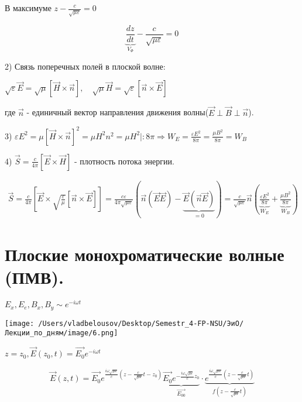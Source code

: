 \documentclass[12pt, a4paper]{report}
\begin{document}
В максимуме \( z - \frac{c}{ \sqrt{ \mu \varepsilon}} = 0   \) 

\[ \displaystyle  \underbrace{\frac{dz}{dt} }_{V_{\Phi }  }- \frac{c}{\sqrt{ \mu \varepsilon}}=0   \] 

2) Связь поперечных полей в плоской волне: 

\( \displaystyle  \sqrt{\varepsilon} \vec{E} = \sqrt{ \mu} [\vec{H}\times \vec{n}], \quad \sqrt{\mu} \vec{H} = \sqrt{ \varepsilon} [\vec{n}\times \vec{E}] \)

где \( \vec{n } \) - единичный вектор направления движения волны(\(  \vec{E} \perp \vec{B} \perp \vec{n} \)). 

3) \( \displaystyle \varepsilon E ^2 = \mu [ \displaystyle \vec{H}\times  \vec{n }] ^2 = \mu H ^2 n ^2 = \mu H ^2 | : 8 \pi \Rightarrow W_E = \frac{\varepsilon E ^2 }{8 \pi} =\frac{\mu B ^2 }{8 \pi} = W_B  \) 

4) \( \vec{S}= \frac{c}{4 \pi}   [ \vec{E}\times \vec{H }] \) - плотность потока энергии. 

\begin{gather*}
    \vec{S} = \frac{c}{4 \pi} [\vec{E } \times  \sqrt{\frac{\varepsilon}{\mu} }[\vec{n }\times  \vec{E}]]= \frac{c \varepsilon}{4 \pi \sqrt{ \mu \varepsilon}} \left( \vec{n}( \vec{E}\vec{E}) - \underbrace{\vec{E}( \vec{n }\vec{E})}_{=0}   \right)= \frac{c}{\sqrt{ \mu \varepsilon}} \vec{n} \left( \underbrace{\frac{\varepsilon E ^2 }{8 \pi}}_{W_E}  +\underbrace{\frac{\mu B ^2 }{8 \pi}  }_{W_B}  \right)   
\end{gather*}

\section{Плоские монохроматические волные (ПМВ).}

\( E_x, E_e, B_x, B_y \sim e^{-i \omega t}   \) 

\text{ }

\begin{minipage}{0.5\textwidth}
    \texttt{[image: /Users/vladbelousov/Desktop/Semestr\_4-FP-NSU/ЭиО/Лекции\_по\_дням/image/6.png]}
\end{minipage}
\begin{minipage}{0.5\textwidth}
     \( z = z_0 , \vec{E}( z_0,t )= \vec{E_0}e^{-i \omega t} \) 
\end{minipage}

\begin{gather*}
  \displaystyle   \vec{E}( z,t)= \vec{E_0} e^{\frac{i \omega \sqrt{ \mu \varepsilon}}{c} \left( z- \frac{c}{\sqrt{\mu \varepsilon}} t -z_0  \right) } \underbrace{\vec{E_0}e^{-\frac{i \omega \sqrt{ \mu \varepsilon}}{c}z_0} }_{\vec{E_{00}}} \cdot \underbrace{e^{\frac{i \omega \sqrt{ \mu \varepsilon}}{c} \left( z - \frac{c}{\sqrt{ \mu \varepsilon}}t  \right)} } _{f (z - \frac{c}{\sqrt{ \mu \varepsilon}}t)}   
\end{gather*}
\end{document}
